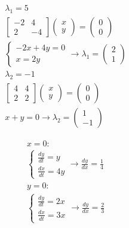 \documentclass{article}
\begin{document}
\addtolength{\jot}{1pt}
\begin{fleqn}[1\parindent]
  \begin{gather*}
    \lambda_1 = 5 \\
    \begin{bmatrix}
      -2 & 4 \\ 2 & -4
    \end{bmatrix}
    \begin{pmatrix}
      x \\ y
    \end{pmatrix}
    = 
    \begin{pmatrix}
      0 \\ 0
    \end{pmatrix} \\
    \begin{cases}
      -2x + 4y = 0 \\
      x = 2y
    \end{cases} \rightarrow
    \lambda_1 = \begin{pmatrix}
      2 \\ 1
    \end{pmatrix} \\
    \lambda_2 = -1 \\
    \begin{bmatrix}
      4 & 4 \\ 2 & 2
    \end{bmatrix}
    \begin{pmatrix}
      x \\ y
    \end{pmatrix}
    =
    \begin{pmatrix}
      0 \\ 0
    \end{pmatrix} \\
    x + y = 0 \rightarrow \lambda_2 = \begin{pmatrix}
      1 \\ -1
    \end{pmatrix} 
  \end{gather*}
\end{fleqn}

\addtolength{\jot}{1pt}
\begin{fleqn}[1\parindent]
  \begin{gather*}
    x = 0: \\ 
    \begin{cases}
      \frac{dy}{dt} = y \\ 
      \frac{dx}{dt} = 4y
    \end{cases} \rightarrow
    \frac{dy}{dx} = \frac{1}{4} \\
    y = 0: \\ 
    \begin{cases}
      \frac{dy}{dt} = 2x \\ 
      \frac{dx}{dt} = 3x
    \end{cases} \rightarrow
    \frac{dy}{dx} = \frac{2}{3}
  \end{gather*}
\end{fleqn}
\end{document}

